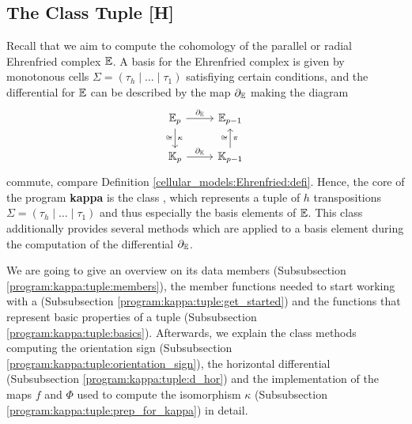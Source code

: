 \subsection{The Class Tuple [H]}
\label{chapter_program:kappa:tuple}

Recall that we aim to compute the cohomology of the parallel or radial Ehrenfried complex $\mathbb E$.
A basis for the Ehrenfried complex is given by monotonous cells $\Sigma = (\tau_h \mid \ldots \mid \tau_1)$ satisfiying certain conditions,
and the differential for $\mathbb E$ can be described by the map $\partial_\mathbb E$ making the diagram
\[
    \begin{tikzcd}
	\E_p \arrow{r}{\del_\E} \arrow{d}{\kappa}[swap]{\cong}      & \E_{p-1} \\
	\KK_p \arrow{r}{\del_\KK}                                     & \KK_{p-1} \arrow{u}{\cong}[swap]{\pi}
    \end{tikzcd}
\]
commute, compare Definition \ref{cellular_models:Ehrenfried:defi}.
Hence, the core of the program \textbf{kappa} is the class , 
which represents a tuple of $h$ transpositions $\Sigma = (\tau_h \mid \ldots \mid \tau_1)$
and thus especially the basis elements of $\mathbb E$.
This class additionally provides several methods which are applied to a basis element during the computation of the differential $\partial_\mathbb E$.

We are going to give an overview on its data members (Subsubsection \ref{program:kappa:tuple:members}),
the member functions needed to start working with a  (Subsubsection \ref{program:kappa:tuple:get_started}) and 
the functions that represent basic properties of a tuple (Subsubsection \ref{program:kappa:tuple:basics}). 
Afterwards, we explain the class methods computing the orientation sign (Subsubsection \ref{program:kappa:tuple:orientation_sign}), 
the horizontal differential (Subsubsection \ref{program:kappa:tuple:d_hor}) and the implementation of the maps $f$ and $\Phi$ used to compute the isomorphism $\kappa$ (Subsubsection \ref{program:kappa:tuple:prep_for_kappa}) in detail. 

